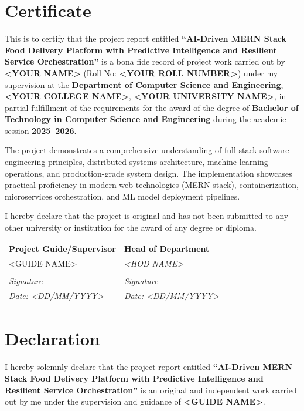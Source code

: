 \documentclass[12pt,a4paper]{report}
\newcommand{\ProjectTitle}{AI-Driven MERN Stack Food Delivery Platform with Predictive Intelligence and Resilient Service Orchestration}
\newcommand{\StudentName}{<YOUR NAME>}
\newcommand{\RollNo}{<YOUR ROLL NUMBER>}
\newcommand{\DepartmentName}{Department of Computer Science and Engineering}
\newcommand{\CollegeName}{<YOUR COLLEGE NAME>}
\newcommand{\UniversityName}{<YOUR UNIVERSITY NAME>}
\newcommand{\GuideName}{<GUIDE NAME>}
\newcommand{\AcademicYear}{2025--2026}
\begin{document}
\chapter*{Certificate}

\noindent
This is to certify that the project report entitled \textbf{``\ProjectTitle''} is a bona fide record of project work carried out by \textbf{\StudentName} (Roll No: \textbf{\RollNo}) under my supervision at the \textbf{\DepartmentName}, \textbf{\CollegeName}, \textbf{\UniversityName}, in partial fulfillment of the requirements for the award of the degree of \textbf{Bachelor of Technology in Computer Science and Engineering} during the academic session \textbf{\AcademicYear}.

\vspace{0.5cm}
\noindent
The project demonstrates a comprehensive understanding of full-stack software engineering principles, distributed systems architecture, machine learning operations, and production-grade system design. The implementation showcases practical proficiency in modern web technologies (MERN stack), containerization, microservices orchestration, and ML model deployment pipelines.

\vspace{0.5cm}
\noindent
I hereby declare that the project is original and has not been submitted to any other university or institution for the award of any degree or diploma.

\vspace{1.8cm}
\noindent
\begin{tabular}{p{} p{}}
\textbf{Project Guide/Supervisor} & \textbf{Head of Department} \\
\GuideName & \textit{<HOD NAME>} \\
\vspace{1.2cm} & \\
\textit{Signature} & \textit{Signature} \\
\textit{Date: <DD/MM/YYYY>} & \textit{Date: <DD/MM/YYYY>} \\
\end{tabular}

\chapter*{Declaration}

I hereby solemnly declare that the project report entitled \textbf{``\ProjectTitle''} is an original and independent work carried out by me under the supervision and guidance of \textbf{\GuideName}. 
\end{document}
